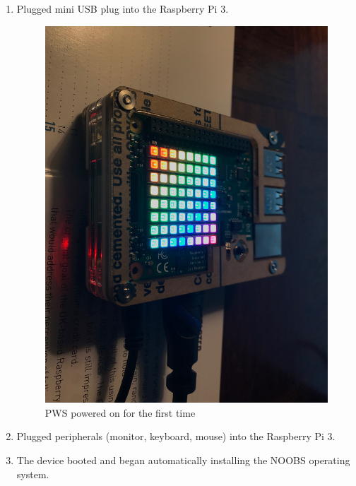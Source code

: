 \documentclass[sigconf]{acmart}
\begin{document}
\begin{enumerate}
\item Plugged mini USB plug into the Raspberry Pi 3.
\begin{figure}[H]
    \centering
    \includegraphics[scale=.10]{ON.jpg}
    \caption{PWS powered on for the first time}
\end{figure}
\item Plugged peripherals (monitor, keyboard, mouse) into the Raspberry Pi 3.
\item The device booted and began automatically installing the NOOBS operating system.
\begin{figure}[H]
    \centering

\end{figure}
\end{enumerate}
\end{document}
